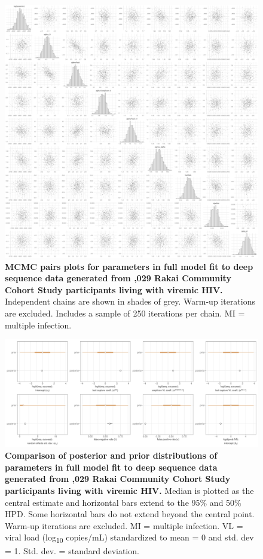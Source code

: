 \documentclass[10pt,letterpaper]{article}
\begin{document}
\begin{figure}[!ht]
 \includegraphics[width=1\textwidth]{../../figures/empirical_full_pairs.pdf}
\caption{{\bf MCMC pairs plots for parameters in full model fit to deep sequence data generated from ,029 Rakai Community Cohort Study participants living with viremic HIV.} Independent chains are shown in shades of grey. Warm-up iterations are excluded. Includes a sample of 250 iterations per chain. MI = multiple infection. }
\end{figure}

\begin{figure}[!ht]
 \includegraphics[width=1\textwidth]{../../figures/empirical_full_prior.pdf}
\caption{{\bf Comparison of posterior and prior distributions of parameters in full model fit to deep sequence data generated from ,029 Rakai Community Cohort Study participants living with viremic HIV.} Median is plotted as the central estimate and horizontal bars extend to the 95\% and 50\% HPD. Some horizontal bars do not extend beyond the central point. Warm-up iterations are excluded. MI = multiple infection. VL = viral load (log\textsubscript{10} copies/mL) standardized to mean = 0 and std. dev = 1. Std. dev. = standard deviation. }
\end{figure}
\end{document}
